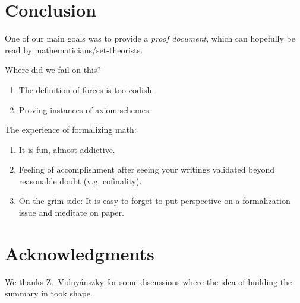 \section{Conclusion}
\label{sec:conclusion}

One of our main goals was to provide a \emph{proof document}, which
can hopefully be read by mathematicians/set-theorists.

Where did we fail on this?
\begin{enumerate}
\item
  The definition of forces is too codish.
\item
  Proving instances of axiom schemes.
\end{enumerate}

The experience of formalizing math:
\begin{enumerate}
\item It is fun, almost addictive.
\item Feeling of accomplishment after seeing your writings
  validated beyond reasonable doubt (v.g. cofinality).
\item On the grim side: It is easy to forget to put perspective on a
  formalization issue and meditate on paper.
\end{enumerate}


\section*{Acknowledgments}
\label{sec:acknowledgments}
We thanks Z.~Vidnyánszky for some discussions where the idea of
building the summary in  took shape.


